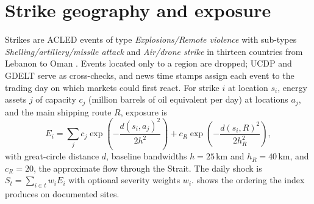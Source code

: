 \documentclass{article}
\begin{document}
\FloatBarrier
\section{Strike geography and exposure}
\label{sec:exposure}

Strikes are ACLED events of type \emph{Explosions/Remote violence} with sub-types \emph{Shelling/artillery/missile attack} and \emph{Air/drone strike} in thirteen countries from Lebanon to Oman \citep{raleigh2010}. Events located only to a region are dropped; UCDP and GDELT serve as cross-checks, and news time stamps assign each event to the trading day on which markets could first react. For strike $i$ at location $s_i$, energy assets $j$ of capacity $c_j$ (million barrels of oil equivalent per day) at locations $a_j$, and the main shipping route $R$, exposure is
\begin{equation}
  E_i = \sum_j c_j \exp\!\left(-\frac{d(s_i,a_j)^2}{2h^2}\right) + c_R \exp\!\left(-\frac{d(s_i,R)^2}{2h_R^2}\right),
  \label{eq:exposure}
\end{equation}
with great-circle distance $d$, baseline bandwidths $h = 25$\,km and $h_R = 40$\,km, and $c_R = 20$, the approximate flow through the Strait. The daily shock is $S_t = \sum_{i \in t} w_i E_i$ with optional severity weights $w_i$.  shows the ordering the index produces on documented sites.
\end{document}
